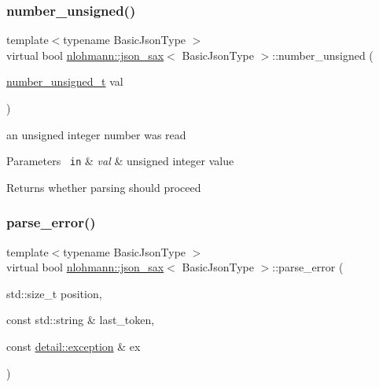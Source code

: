 \subsubsection{\texorpdfstring{number\_unsigned()}{number\_unsigned()}}
{\footnotesize\ttfamily template$<$typename Basic\+Json\+Type $>$ \\
virtual bool \mbox{\hyperlink{structnlohmann_1_1json__sax}{nlohmann\+::json\+\_\+sax}}$<$ Basic\+Json\+Type $>$\+::number\+\_\+unsigned (\begin{DoxyParamCaption}\item[{\mbox{\hyperlink{structnlohmann_1_1json__sax_a32028cc056ae0f43aaae331cdbbbf856}{number\+\_\+unsigned\+\_\+t}}}]{val }\end{DoxyParamCaption})\hspace{0.3cm}{\ttfamily [pure virtual]}}



an unsigned integer number was read 


\begin{DoxyParams}[1]{Parameters}
\mbox{\texttt{ in}}  & {\em val} & unsigned integer value \\
\hline
\end{DoxyParams}
\begin{DoxyReturn}{Returns}
whether parsing should proceed 
\end{DoxyReturn}
\mbox{\label{structnlohmann_1_1json__sax_a60287e3bd85f489e04c83f7e3b76e613}} 
\subsubsection{\texorpdfstring{parse\_error()}{parse\_error()}}
{\footnotesize\ttfamily template$<$typename Basic\+Json\+Type $>$ \\
virtual bool \mbox{\hyperlink{structnlohmann_1_1json__sax}{nlohmann\+::json\+\_\+sax}}$<$ Basic\+Json\+Type $>$\+::parse\+\_\+error (\begin{DoxyParamCaption}\item[{std\+::size\+\_\+t}]{position,  }\item[{const std\+::string \&}]{last\+\_\+token,  }\item[{const \mbox{\hyperlink{classnlohmann_1_1detail_1_1exception}{detail\+::exception}} \&}]{ex }\end{DoxyParamCaption})\hspace{0.3cm}{\ttfamily [pure virtual]}}



